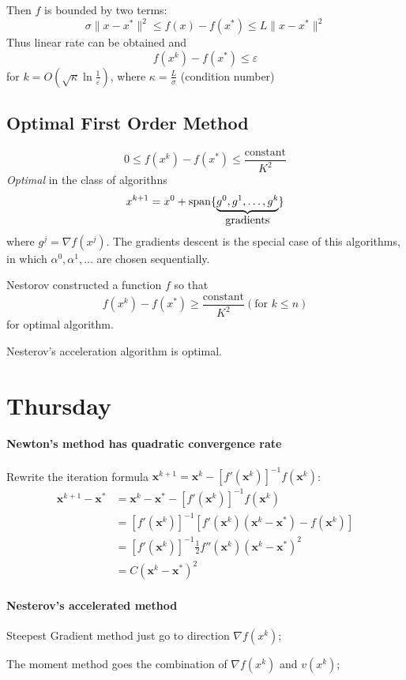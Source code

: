 Then $f$ is bounded by two terms:
\[
\sigma\|x-x^*\|^2\le f(x) - f(x^*)\le L\|x-x^*\|^2
\]
Thus linear rate can be obtained and
\[
f(x^k)-f(x^*)\le\varepsilon
\]
for $k=O(\sqrt{\kappa}\ln\frac{1}{\varepsilon})$, where $\kappa=\frac{L}{\sigma}$ (condition number)

\subsection{Optimal First Order Method}
\[
0\le f(x^k) - f(x^*)\le\frac{\mbox{constant}}{K^2}
\]
\emph{Optimal} in the class of algorithns
\[
x^{k+1}=x^0+\operatorname{span}\{\underbrace{g^0,g^1,\dots,g^k}_{\mbox{gradients}}\}
\]
where $g^j=\nabla f(x^j)$. The gradients descent is the special case of this algorithms, in which $\alpha^0,\alpha^1,\dots$ are chosen sequentially.

Nestorov constructed a function $f$ so that
\[
f(x^k) - f(x^*)\ge\frac{\mbox{constant}}{K^2} (\mbox{for $k\le n$})
\]
for optimal algorithm.

Nesterov's acceleration algorithm is optimal.





\section{Thursday}
\paragraph{Newton's method has quadratic convergence rate}
Rewrite the iteration formula $\bm x^{k+1}=\bm x^k-[f'(\bm x^k)]^{-1}f(\bm x^k)$:
\begin{align*}
\bm x^{k+1}-\bm x^*&=\bm x^k-\bm x^*-[f'(\bm x^k)]^{-1}f(\bm x^k)\\
&=[f'(\bm x^k)]^{-1}[f'(\bm x^k)(\bm x^k-\bm x^*) - f(\bm x^k)]\\
&=[f'(\bm x^k)]^{-1}\frac{1}{2}f''(\bm x^k)(\bm x^k-\bm x^*)^2\\
&=C(\bm x^k-\bm x^*)^2
\end{align*}

\paragraph{Nesterov's accelerated method}
Steepest Gradient method just go to direction $\nabla f(x^k)$;

The moment method goes the combination of $\nabla f(x^k)$ and $v(x^k)$;

